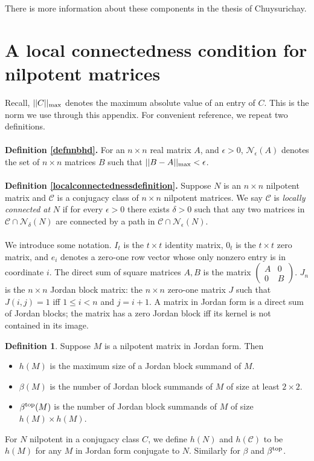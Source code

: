 \documentclass{amsart}
\theoremstyle{definition}
\newtheorem{definition}[theorem]{Definition}
\theoremstyle{remark}
\numberwithin{equation}{section}
\begin{document}
{{There is more information about these components in 
the thesis \cite{Ch} of Chuysurichay.


\section{A local connectedness condition for nilpotent matrices}
\label{connectionappendix} 

Recall,  $||C||_{\textnormal{max}}$ denotes the maximum absolute value of an 
entry of $C$. This is the norm we use through this appendix. 
For convenient reference, we repeat two definitions. 
\\ \\ 
{\bf Definition \ref{defnnbhd}.}
 For an $n\times n$ real matrix $A$,  and $\epsilon >0$,  
$\mathcal N_{\epsilon}(A)$ denotes the set of $n\times n$ 
matrices $B$ such that  $||B-A||_{\textnormal{max}}< \epsilon $. 
\\ \\ 
{\bf Definition \ref{localconnectednessdefinition}.} 
Suppose $N$ is an $n\times n$ nilpotent matrix and 
$\mathcal C$ is a 
 conjugacy class of  $n\times n$ 
nilpotent matrices. We say $\mathcal C$ is 
{\it locally connected at} $N$ if  for every $\epsilon >0$ 
there exists 
$\delta >0$ such that any two matrices in 
$\mathcal C \cap \mathcal N_{\delta}(N)$ are connected 
by a path in $\mathcal C \cap\mathcal N_{\epsilon}(N)$.
\\ \\ 
We introduce 
some  notation. 
$I_t$ is the $t\times t$ identity matrix, 
$0_t$ is the $t\times t$ zero matrix, 
and  
$e_i$ denotes a zero-one row vector whose 
only nonzero entry is in coordinate $i$. 
The direct sum of square matrices $A,B$ is 
the matrix 
$
\left(
\begin{smallmatrix} A & 0 \\ 0 & B 
\end{smallmatrix}
\right)
$. 
$J_n$ is the $n\times n$ 
Jordan block matrix: 
the $n\times n$ zero-one matrix $J$ 
 such that $J(i,j) =1$ iff 
$1\leq i < n$ and $j=i+1$. 
A matrix in Jordan form is a direct sum of Jordan blocks; 
the matrix  
has a zero 
Jordan block iff its kernel is not contained in its image. 

\begin{definition}\label{betasnotation} 
Suppose  $M$ is a  nilpotent matrix in Jordan form. 
Then 
\begin{itemize} 
\item 
$h(M)$ is the maximum size of a Jordan block summand of $M$.  
\item 
$\beta(M)$ is the number of Jordan block summands of $M$ of size 
at least $2\times 2$. 
\item 
$\beta^{\textnormal{top}}(M)$ is the number of Jordan block summands of $M$ 
of size $h(M)\times h(M)$. 
\end{itemize} 
For $N$ nilpotent in a conjugacy class $C$, we define 
$h(N)$ and $h({\mathcal C})$ to be $h(M)$ for any $M$ in Jordan 
form conjugate to $N$. Similarly for $\beta$ and 
$\beta^{\textnormal{top}}$. 
\end{definition} 

}}
\end{document}
